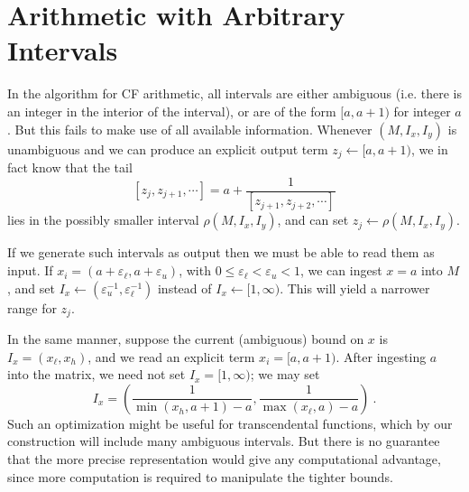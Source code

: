 \documentclass[11pt, oneside]{amsart}   	%
\renewcommand{\:}{\negthickspace:\negthickspace}
\begin{document}
\section{Arithmetic with Arbitrary Intervals}
In the algorithm for CF arithmetic, all intervals are either ambiguous (i.e. there is an integer in the interior of the interval), or are of the form $[a,a+1)$ for integer $a$. But this fails to make use of all available information.
Whenever $(M,I_x, I_y)$ is unambiguous and we can produce an explicit output term $z_j \leftarrow [a,a+1)$, we in fact know that the tail 
\[
[z_j, z_{j+1},\cdots] = a + \frac{1}{[z_{j+1}, z_{j+2},\cdots]}
\]
lies in the possibly smaller interval $\rho(M,I_x, I_y)$, and can set $z_j \leftarrow \rho(M,I_x, I_y)$.

If we generate such intervals as output then we must be able to read them as input. If $x_i = (a+\varepsilon_\ell, a+\varepsilon_u)$, with $0 \leq \varepsilon_\ell < \varepsilon_u <1$, we can ingest $x=a$ into $M$, and set $I_x \leftarrow (\varepsilon_u^{-1}, \varepsilon_\ell^{-1})$ instead of $I_x \leftarrow [1,\infty)$. This will yield a narrower range for $z_j$.

In the same manner, suppose the current (ambiguous) bound on $x$ is $I_x = (x_{\ell}, x_{h})$, and we read an explicit term $x_i = [a,a+1)$. After ingesting $a$ into the matrix, we need not set $I_x = [1,\infty)$; we may set
\[
I_x = \left(\frac{1}{\min(x_h,a+1) - a}, \frac{1}{\max(x_{\ell},a) - a}\right) \ .
\]
Such an optimization might be useful for transcendental functions, which by our construction will include many ambiguous intervals. But there is no guarantee that the more precise representation would give any computational advantage, since more computation is required to manipulate the tighter bounds.





\end{document}
